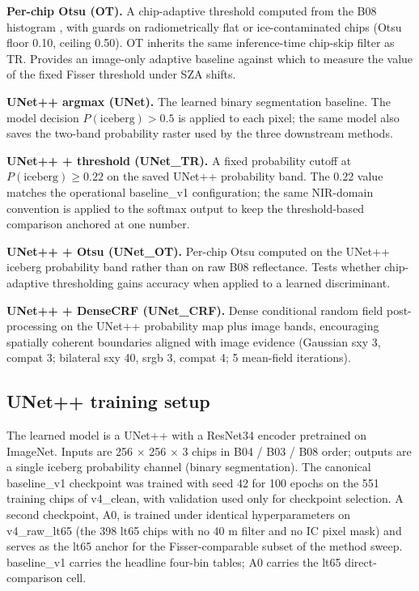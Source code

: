 \documentclass[review,jog]{igs}
\begin{document}
\textbf{Per-chip Otsu (OT).} A chip-adaptive threshold computed from the B08 histogram \citep{Otsu1979}, with guards on radiometrically flat or ice-contaminated chips (Otsu floor 0.10, ceiling 0.50). OT inherits the same inference-time chip-skip filter as TR. Provides an image-only adaptive baseline against which to measure the value of the fixed Fisser threshold under SZA shifts.

\textbf{UNet++ argmax (UNet).} The learned binary segmentation baseline. The model decision $P(\mathrm{iceberg}) > 0.5$ is applied to each pixel; the same model also saves the two-band probability raster used by the three downstream methods.

\textbf{UNet++ + threshold (UNet\_TR).} A fixed probability cutoff at $P(\mathrm{iceberg}) \geq 0.22$ on the saved UNet++ probability band. The 0.22 value matches the operational baseline\_v1 configuration; the same NIR-domain convention is applied to the softmax output to keep the threshold-based comparison anchored at one number.

\textbf{UNet++ + Otsu (UNet\_OT).} Per-chip Otsu computed on the UNet++ iceberg probability band rather than on raw B08 reflectance. Tests whether chip-adaptive thresholding gains accuracy when applied to a learned discriminant.

\textbf{UNet++ + DenseCRF (UNet\_CRF).} Dense conditional random field post-processing \citep{Krahenbuhl2011} on the UNet++ probability map plus image bands, encouraging spatially coherent boundaries aligned with image evidence (Gaussian sxy 3, compat 3; bilateral sxy 40, srgb 3, compat 4; 5 mean-field iterations).

\subsection{UNet++ training setup}

The learned model is a UNet++ \citep{Zhou2018} with a ResNet34 \citep{He2016} encoder pretrained on ImageNet. Inputs are 256 $\times$ 256 $\times$ 3 chips in B04 / B03 / B08 order; outputs are a single iceberg probability channel (binary segmentation). The canonical baseline\_v1 checkpoint was trained with seed 42 for 100 epochs on the 551 training chips of v4\_clean, with validation used only for checkpoint selection. A second checkpoint, A0, is trained under identical hyperparameters on v4\_raw\_lt65 (the 398 lt65 \citet{Fisser2024} chips with no 40 m filter and no IC pixel mask) and serves as the lt65 anchor for the Fisser-comparable subset of the method sweep. baseline\_v1 carries the headline four-bin tables; A0 carries the lt65 direct-comparison cell.
\end{document}
